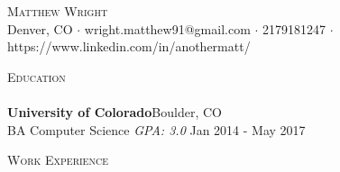 \documentclass[a4paper]{article}
\newcommand{\lineunder} {
    \vspace*{-8pt} \\
    \hspace*{-18pt} \hrulefill \\
}
\newcommand{\header} [1] {
    {\hspace*{-18pt}\vspace*{6pt} \textsc{#1}}
    \vspace*{-6pt} \lineunder
}
\begin{document}
\vspace*{-40pt}

    

\vspace*{-10pt}
\begin{center}
	{\Huge \scshape {Matthew Wright}}\\
	Denver, CO $\cdot$ wright.matthew91@gmail.com $\cdot$ 2179181247 $\cdot$ https://www.linkedin.com/in/anothermatt/\\
\end{center}

\header{Education}
\textbf{University of Colorado}\hfill Boulder, CO\\
BA Computer Science \textit{GPA: 3.0} \hfill Jan 2014 - May 2017\\
\vspace{2mm}

\header{Work Experience}
\vspace{1mm}
\end{document}
